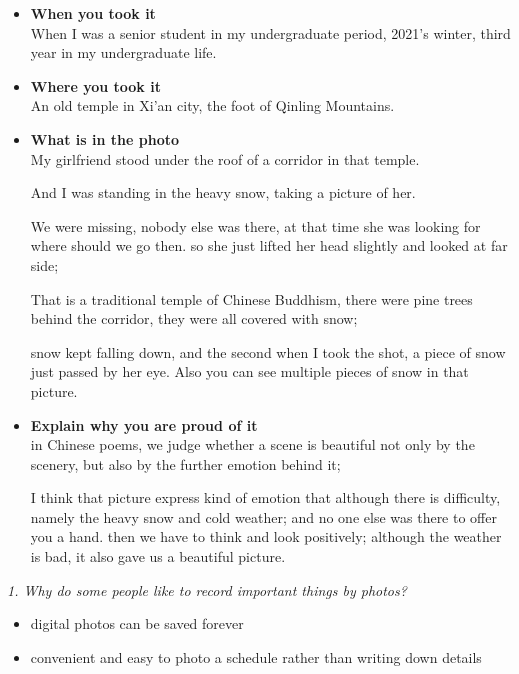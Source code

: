 \documentclass[conference]{IEEEtran}
\begin{document}
\begin{itemize}
    \item \textbf{When you took it}\\
    When I was a senior student in my undergraduate period, 2021's winter, 
    third year in my undergraduate life.

    \item \textbf{Where you took it}\\
    An old temple in Xi'an city, the foot of Qinling Mountains.

    \item \textbf{What is in the photo}\\
    My girlfriend stood under the roof of a corridor in that temple.

    And I was standing in the heavy snow, taking a picture of her.
    
    We were missing, nobody else was there, at that time she was looking for where should we go then.
    so she just lifted her head slightly and looked at far side;

    That is a traditional temple of Chinese Buddhism, there were pine trees behind the corridor, 
    they were all covered with snow;
    
    snow kept falling down, and the second when I took the shot, a piece of snow just passed by her eye. 
    Also you can see multiple pieces of snow in that picture. 
    
    \item \textbf{Explain why you are proud of it}\\
    in Chinese poems, we judge whether a scene is beautiful not only by the scenery, but also by the further emotion behind it;
    
    I think that picture express kind of emotion that although there is difficulty, namely the heavy snow and cold weather;
    and no one else was there to offer you a hand.
    then we have to think and look positively; although the weather is bad, it also gave us a beautiful picture.
\end{itemize}

\textit{1. Why do some people like to record important things by photos?}

\begin{itemize}
    \item  digital photos can be saved forever
    \item  convenient and easy to photo a schedule rather than writing down details
\end{itemize}
\end{document}
